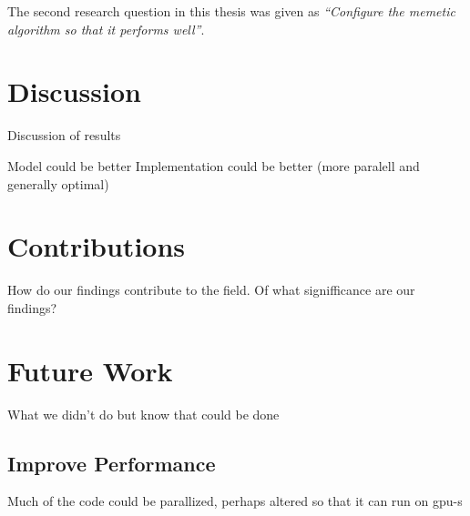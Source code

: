 The second research question in this thesis was given as \emph{\enquote{Configure the memetic algorithm so that it performs well}}. 



\section{Discussion}
Discussion of results

Model could be better
Implementation could be better (more paralell and generally optimal)



\section{Contributions}
How do our findings contribute to the field. Of what signifficance are our findings?

\section{Future Work}
What we didn't do but know that could be done

\subsection{Improve Performance}
Much of the code could be parallized, perhaps altered so that it can run on gpu-s

